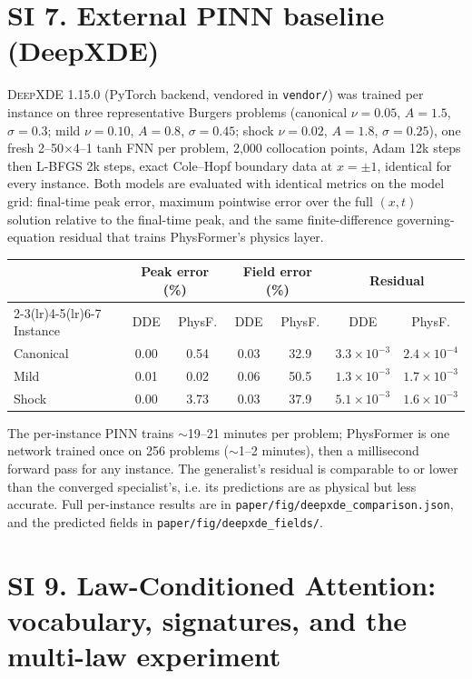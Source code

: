\documentclass[11pt,a4paper]{article}
\begin{document}
\section*{SI 7. External PINN baseline (DeepXDE)}

\textsc{DeepXDE} 1.15.0 (PyTorch backend, vendored in \texttt{vendor/})
was trained per instance on three representative Burgers problems
(canonical $\nu{=}0.05$, $A{=}1.5$, $\sigma{=}0.3$; mild $\nu{=}0.10$,
$A{=}0.8$, $\sigma{=}0.45$; shock $\nu{=}0.02$, $A{=}1.8$,
$\sigma{=}0.25$), one fresh 2--50$\times$4--1 tanh FNN per problem, 2{,}000
collocation points, Adam 12k steps then L-BFGS 2k steps, exact Cole--Hopf
boundary data at $x=\pm1$, identical for every instance. Both models are
evaluated with identical metrics on the model grid: final-time peak error,
maximum pointwise error over the full $(x,t)$ solution relative to the
final-time peak, and the same finite-difference governing-equation
residual that trains PhysFormer's physics layer.

\begin{center}
\small
\begin{tabular}{lcccccc}
\toprule
 & \multicolumn{2}{c}{Peak error (\%)} & \multicolumn{2}{c}{Field error (\%)} & \multicolumn{2}{c}{Residual} \\
\cmidrule(lr){2-3}\cmidrule(lr){4-5}\cmidrule(lr){6-7}
Instance & DDE & PhysF. & DDE & PhysF. & DDE & PhysF. \\
\midrule
Canonical & 0.00 & 0.54 & 0.03 & 32.9 & $3.3\times10^{-3}$ & $2.4\times10^{-4}$ \\
Mild & 0.01 & 0.02 & 0.06 & 50.5 & $1.3\times10^{-3}$ & $1.7\times10^{-3}$ \\
Shock & 0.00 & 3.73 & 0.03 & 37.9 & $5.1\times10^{-3}$ & $1.6\times10^{-3}$ \\
\bottomrule
\end{tabular}
\end{center}

The per-instance PINN trains $\sim$19--21 minutes per problem; PhysFormer
is one network trained once on 256 problems ($\sim$1--2 minutes), then a
millisecond forward pass for any instance. The generalist's residual is
comparable to or lower than the converged specialist's, i.e. its
predictions are as physical but less accurate. Full per-instance results
are in \texttt{paper/fig/deepxde\_comparison.json}, and the predicted
fields in \texttt{paper/fig/deepxde\_fields/}.

\section*{SI 9. Law-Conditioned Attention: vocabulary, signatures, and the multi-law experiment}
\end{document}
